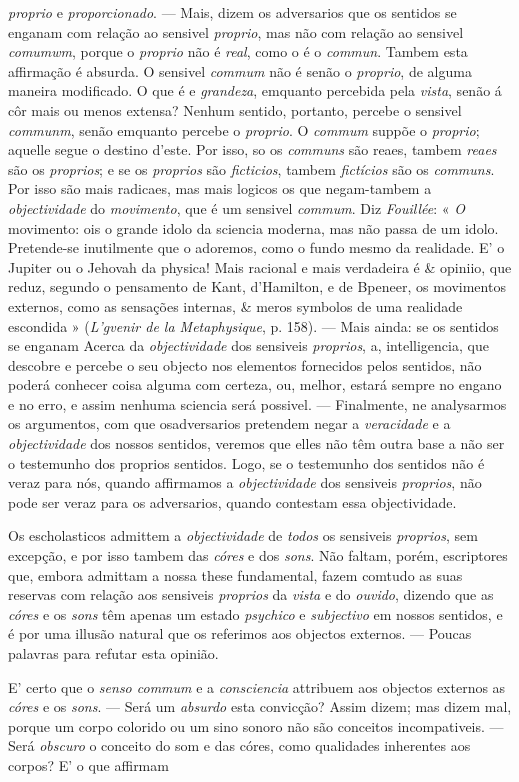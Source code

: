 \emph{proprio} e \emph{proporcionado}. --- Mais, dizem os adversarios que os sentidos se enganam com relação ao sensivel \emph{proprio}, mas não com relação ao sensivel \emph{comumwm}, porque o \emph{proprio} não é \emph{real}, como o é o \emph{commun}. Tambem esta affirmação é absurda. O sensivel \emph{commum} não é senão o \emph{proprio}, de alguma maneira modificado. O que é e \emph{grandeza}, emquanto percebida pela \emph{vista}, senão á côr mais ou menos extensa? Nenhum sentido, portanto, percebe o sensivel \emph{communm}, senão emquanto percebe o \emph{proprio}. O \emph{commum} suppõe o \emph{proprio}; aquelle segue o destino d'este. Por isso, so os \emph{communs} são reaes, tambem \emph{reaes} são os \emph{proprios}; e se os \emph{proprios} são \emph{ficticios}, tambem \emph{fictícios} são os \emph{communs}. Por isso são mais radicaes, mas mais logicos os que negam-tambem a \emph{objectividade} do \emph{movimento}, que é um sensivel \emph{commum}. Diz \emph{Fouillée}: « \emph{O} movimento: ois o grande idolo da sciencia moderna, mas não passa de um idolo. Pretende-se inutilmente que o adoremos, como o fundo mesmo da realidade. E' o Jupiter ou o Jehovah da physica! Mais racional e mais verdadeira é \& opiniio, que reduz, segundo o pensamento de Kant, d'Hamilton, e de Bpeneer, os movimentos externos, como as sensações internas, \& meros symbolos de uma realidade escondida » (\emph{L'gvenir de la Metaphysique}, p. 158). --- Mais ainda: se os sentidos se enganam Acerca da \emph{objectividade} dos sensiveis \emph{proprios}, a, intelligencia, que descobre e percebe o seu objecto nos elementos fornecidos pelos sentidos, não poderá conhecer coisa alguma com certeza, ou, melhor, estará sempre no engano e no erro, e assim nenhuma sciencia será possivel. --- Finalmente, ne analysarmos os argumentos, com que osadversarios pretendem negar a \emph{veracidade} e a \emph{objectividade} dos nossos sentidos, veremos que elles não têm outra base a não ser o testemunho dos proprios sentidos. Logo, se o testemunho dos sentidos não é veraz para nós, quando affirmamos a \emph{objectividade} dos sensiveis \emph{proprios}, não pode ser veraz para os adversarios, quando contestam essa objectividade.\par Os escholasticos admittem a \emph{objectividade} de \emph{todos} os sensiveis \emph{proprios}, sem excepção, e por isso tambem das \emph{córes} e dos \emph{sons}. Não faltam, porém, escriptores que, embora admittam a nossa these fundamental, fazem comtudo as suas reservas com relação aos sensiveis \emph{proprios} da \emph{vista} e do \emph{ouvido}, dizendo que as \emph{córes} e os \emph{sons} têm apenas um estado \emph{psychico} e \emph{subjectivo} em nossos sentidos, e é por uma illusão natural que os referimos aos objectos externos. --- Poucas palavras para refutar esta opinião.\par E' certo que o \emph{senso commum} e a \emph{consciencia} attribuem aos objectos externos as \emph{córes} e os \emph{sons}. --- Será um \emph{absurdo} esta convicção? Assim dizem; mas dizem mal, porque um corpo colorido ou um sino sonoro não são conceitos incompativeis. --- Será \emph{obscuro} o conceito do som e das córes, como qualidades inherentes aos corpos? E' o que affirmam 